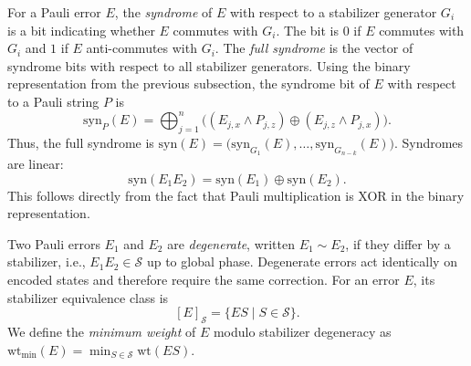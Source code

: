 \documentclass[acmsmall,screen,review,anonymous,nonacm]{acmart}
\begin{document}
For a Pauli error $E$, the \emph{syndrome} of $E$ with respect to a stabilizer generator $G_i$ is a bit indicating whether $E$ commutes with $G_i$. The bit is $0$ if $E$ commutes with $G_i$ and $1$ if $E$ anti-commutes with $G_i$. The \emph{full syndrome} is the vector of syndrome bits with respect to all stabilizer generators.
Using the binary representation from the previous subsection, the syndrome bit of $E$ with respect to a Pauli string $P$ is
$$\mathrm{syn}_P(E)
=
\bigoplus_{j=1}^n
\bigl(
(E_{j,x}\land P_{j,z})
\oplus
(E_{j,z}\land P_{j,x})
\bigr).$$ Thus, the full syndrome is
$\mathrm{syn}(E)
=
\bigl(
\mathrm{syn}_{G_1}(E),
\ldots,
\mathrm{syn}_{G_{n-k}}(E)
\bigr)$. Syndromes are linear: $$\mathrm{syn}(E_1E_2)
=
\mathrm{syn}(E_1)
\oplus
\mathrm{syn}(E_2).$$ This follows directly from the fact that Pauli multiplication is XOR in the binary representation.

Two Pauli errors $E_1$ and $E_2$ are \emph{degenerate}, written $E_1\sim E_2$, if they differ by a stabilizer, i.e., $E_1E_2\in\mathcal{S}$ up to global phase.
Degenerate errors act identically on encoded states and therefore require the same correction. For an error $E$, its stabilizer equivalence class is
$$[E]_{\mathcal{S}}
=
\{ES \mid S\in\mathcal{S}\}.$$
We define the \emph{minimum weight} of $E$ modulo stabilizer degeneracy as
$\mathrm{wt}_{\min}(E)
=
\min_{S\in\mathcal{S}}\mathrm{wt}(ES)$.

\end{document}
